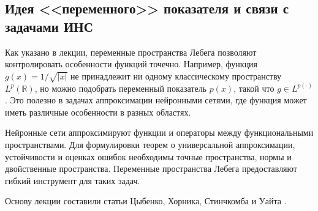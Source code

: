 \documentclass[../NDCNNAI_main.tex]{subfiles}
\begin{document}
\subsection{Идея <<переменного>> показателя и связи с задачами ИНС}

Как указано в лекции, переменные пространства Лебега позволяют контролировать особенности функций точечно. Например, функция \( g(x) = 1/\sqrt{|x|} \) не принадлежит ни одному классическому пространству \( L^p(\mathbb{R}) \), но можно подобрать переменный показатель \( p(x) \), такой что \( g \in L^{p(\cdot)} \). Это полезно в задачах аппроксимации нейронными сетями, где функция может иметь различные особенности в разных областях.

Нейронные сети аппроксимируют функции и операторы между функциональными пространствами. Для формулировки теорем о универсальной аппроксимации, устойчивости и оценках ошибок необходимы точные пространства, нормы и двойственные пространства. Переменные пространства Лебега предоставляют гибкий инструмент для таких задач.

Основу лекции составили статьи Цыбенко, Хорника, Стинчкомба и Уайта \cite{Cybenko1989, Hornik1991, Hornik1990}.


\end{document}
